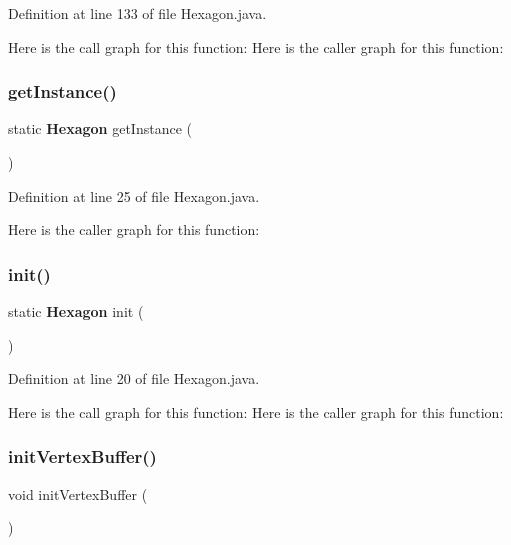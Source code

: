 Definition at line 133 of file Hexagon.\+java.

Here is the call graph for this function\+:
Here is the caller graph for this function\+:
\mbox{\label{classsf_1_1unitingtwist_1_1_hexagon_a0428295cb76ddb8aaa39007c6e98a294}} 
\subsubsection{get\+Instance()}
{\footnotesize\ttfamily static \textbf{ Hexagon} get\+Instance (\begin{DoxyParamCaption}{ }\end{DoxyParamCaption})\hspace{0.3cm}{\ttfamily [static]}}



Definition at line 25 of file Hexagon.\+java.

Here is the caller graph for this function\+:
\mbox{\label{classsf_1_1unitingtwist_1_1_hexagon_a6bacb22e3ae6e84e8dd537d4f92b8e68}} 
\subsubsection{init()}
{\footnotesize\ttfamily static \textbf{ Hexagon} init (\begin{DoxyParamCaption}{ }\end{DoxyParamCaption})\hspace{0.3cm}{\ttfamily [static]}}



Definition at line 20 of file Hexagon.\+java.

Here is the call graph for this function\+:
Here is the caller graph for this function\+:
\mbox{\label{classsf_1_1unitingtwist_1_1_hexagon_a5061e0bcf0ce4e87bfae8db5d387b2ea}} 
\subsubsection{init\+Vertex\+Buffer()}
{\footnotesize\ttfamily void init\+Vertex\+Buffer (\begin{DoxyParamCaption}{ }\end{DoxyParamCaption})}



